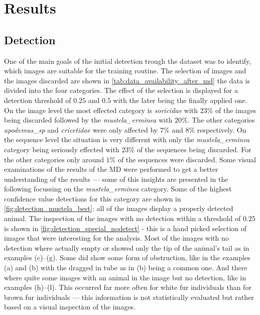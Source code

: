 

\section{Results}
\label{results}

    \subsection{Detection}
    One of the main goals of the initial detection trough the dataset was to identify, which images are suitable for the training routine.
    The selection of images and the images discarded are shown in \autoref{tab:data_availability_after_md} the data is divided into the four categories.
    The effect of the selection is displayed for a detection threshold of \(0.25\) and \(0.5\) with the later being the finally applied one.
    On the image level the most effected category is \textit{soricidae} with \(23\%\) of the images being discarded followed by the \textit{mustela\_erminea} with \(20\%\).
    The other categories \textit{apodemus\_sp} and \textit{cricetidae} were only affected by \(7\%\) and \(8\%\) respectively.
    On the sequence level the situation is very different with only the \textit{mustela\_erminea} category being seriously effected with \(23\%\) of the sequences being discarded.
    For the other categories only around \(1\%\) of the sequences were discarded.
    Some visual examinations of the results of the MD were performed to get a better understanding of the results --- some of this insights are presented in the following focussing on the \textit{mustela\_erminea} category.
    Some of the highest confidence value detections for this category are shown in \autoref{fig:detection_mustela_best}: all of the images display a properly detected animal.
    The inspection of the images with no detection within a threshold of \(0.25\) is shown in \autoref{fig:detection_special_nodetect} - this is a hand picked selection of images that were interesting for the analysis.
    Most of the images with no detection where actually empty or showed only the tip of the animal's tail as in examples (c)--(g).
    Some did show some form of obstruction, like in the examples (a) and (b) with the dragged in tube as in (b) being a common one.
    And there where quite some images with an animal in the image but no detection, like in examples (h)--(l).
    This occurred far more often for white fur individuals than for brown fur individuals --- this information is not statistically evaluated but rather based on a visual inspection of the images.

